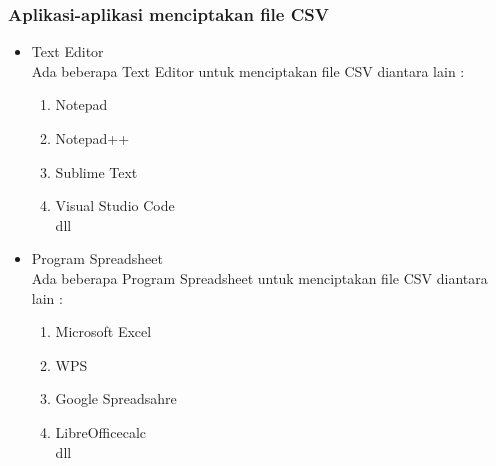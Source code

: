 \subsubsection{Aplikasi-aplikasi menciptakan file CSV}
\begin{itemize}
	\item Text Editor \\
	Ada beberapa Text Editor untuk menciptakan file CSV diantara lain : 
	\begin{enumerate}
		\item Notepad
		\item Notepad++
		\item Sublime Text
		\item Visual Studio Code \\
		dll	
	\end{enumerate}

	\item Program Spreadsheet \\
	Ada beberapa Program Spreadsheet untuk menciptakan file CSV diantara lain : 
	\begin{enumerate}
		\item Microsoft Excel
		\item WPS
		\item Google Spreadsahre
		\item LibreOfficecalc \\
		dll	
	\end{enumerate}
\end{itemize}

